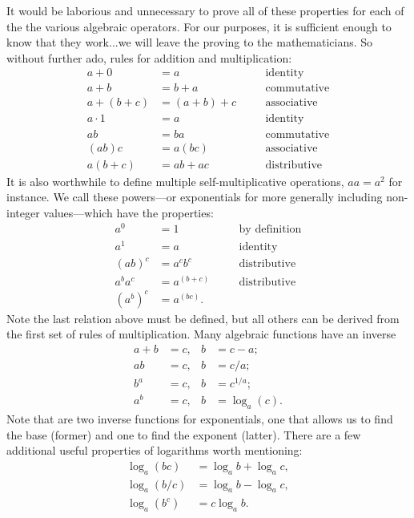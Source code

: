 It would be laborious and unnecessary to prove all of these properties for each
of the the various algebraic operators.  For our purposes, it is sufficient
enough to know that they work...we will leave the proving to the
mathematicians.  So without further ado, rules for addition and multiplication:
\begin{align}
    a + 0 &= a          && \quad \text{identity} \\
    a + b &= b + a      && \quad \text{commutative} \\
    a + (b + c) &= (a + b) + c && \quad \text{associative} \\
    a \cdot 1 &= a      && \quad \text{identity} \\
    ab &= ba            && \quad \text{commutative} \\
    (ab)c &= a(bc)      && \quad \text{associative} \\
    a(b + c) &= ab + ac && \quad \text{distributive}
\end{align}
It is also worthwhile to define multiple self-multiplicative operations, $aa =
a^2$ for instance.  We call these powers---or exponentials for more generally
including non-integer values---which have the properties:
\begin{align}
    a^0 &= 1            && \quad \text{by definition} \\
    a^1 &= a            && \quad \text{identity} \\
    (ab)^c &= a^c b^c   && \quad \text{distributive} \\
    a^b a^c &= a^{(b + c)} && \quad \text{distributive} \\
    (a^b)^c &= a^{(bc)} .
\end{align}
Note the last relation above must be defined, but all others can be derived from
the first set of rules of multiplication.  Many algebraic functions have an
inverse
\begin{align}
    a + b &= c, & b &= c - a; \\
    ab &= c, & b &= c/a; \\
    b^a &= c, & b &= c^{1/a}; \\
    a^b &= c, & b &= \log_a (c) .
\end{align}
Note that are two inverse functions for exponentials, one that allows us to find
the base (former) and one to find the exponent (latter).  There are a few
additional useful properties of logarithms worth mentioning:
\begin{align*}
    \log_a (bc) &= \log_a b + \log_a c , \\
    \log_a (b/c) &= \log_a b - \log_a c , \\
    \log_a (b^c) &= c \log_a b .
\end{align*}

